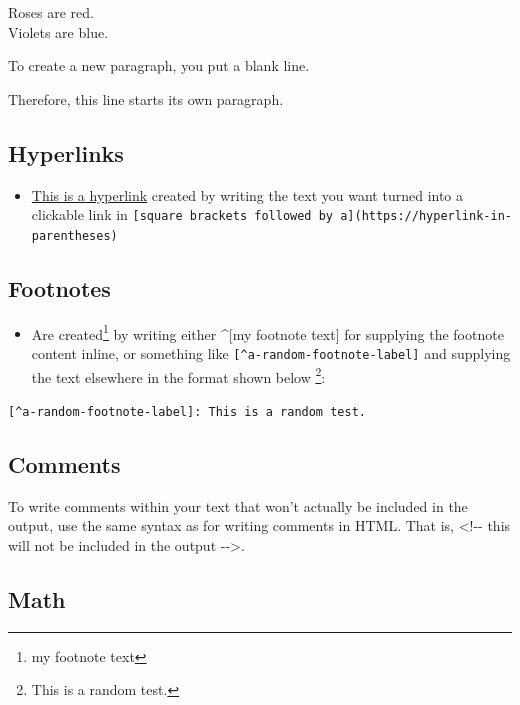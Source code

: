 \documentclass[a4paper, twoside]{templates/ociamthesis}
\providecommand{\tightlist}{%
  \setlength{\itemsep}{0pt}\setlength{\parskip}{0pt}}
\begin{document}
Roses are red.\\
Violets are blue.

To create a new paragraph, you put a blank line.

Therefore, this line starts its own paragraph.

\hypertarget{hyperlinks}{%
\subsection{Hyperlinks}\label{hyperlinks}}

\begin{itemize}
\tightlist
\item
  \href{https://www.google.com}{This is a hyperlink} created by writing the text you want turned into a clickable link in \texttt{{[}square\ brackets\ followed\ by\ a{]}(https://hyperlink-in-parentheses)}
\end{itemize}

\hypertarget{footnotes}{%
\subsection{Footnotes}\label{footnotes}}

\begin{itemize}
\tightlist
\item
  Are created\footnote{my footnote text} by writing either \^{}{[}my footnote text{]} for supplying the footnote content inline, or something like \texttt{{[}\^{}a-random-footnote-label{]}} and supplying the text elsewhere in the format shown below \footnote{This is a random test.}:
\end{itemize}

\texttt{{[}\^{}a-random-footnote-label{]}:\ This\ is\ a\ random\ test.}

\hypertarget{comments}{%
\subsection{Comments}\label{comments}}

To write comments within your text that won't actually be included in the output, use the same syntax as for writing comments in HTML. That is, \textless!-\/- this will not be included in the output -\/-\textgreater.

\hypertarget{math}{%
\subsection{Math}\label{math}}
\end{document}
